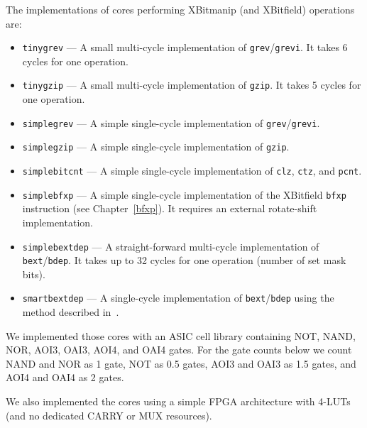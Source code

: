 The implementations of cores performing XBitmanip (and XBitfield) operations are:

\begin{itemize}
\item {\tt tinygrev} --- A small multi-cycle implementation of {\tt grev}/{\tt grevi}.
It takes 6 cycles for one operation.
\item {\tt tinygzip} --- A small multi-cycle implementation of {\tt gzip}.
It takes 5 cycles for one operation.
\item {\tt simplegrev} --- A simple single-cycle implementation of {\tt grev}/{\tt grevi}.
\item {\tt simplegzip} --- A simple single-cycle implementation of {\tt gzip}.
\item {\tt simplebitcnt} --- A simple single-cycle implementation of {\tt clz}, {\tt ctz}, and {\tt pcnt}.
\item {\tt simplebfxp} --- A simple single-cycle implementation of the XBitfield {\tt bfxp}
instruction (see Chapter~\ref{bfxp}). It requires an external rotate-shift implementation.
\item {\tt simplebextdep} --- A straight-forward multi-cycle implementation of {\tt bext}/{\tt bdep}.
It takes up to 32 cycles for one operation (number of set mask bits).
\item {\tt smartbextdep} --- A single-cycle implementation of {\tt bext}/{\tt bdep}
using the method described in~\cite{Hilewitz06}.
\end{itemize}

We implemented those cores with an ASIC cell library containing NOT, NAND, NOR,
AOI3, OAI3, AOI4, and OAI4 gates. For the gate counts below we count NAND and NOR
as 1 gate, NOT as 0.5 gates, AOI3 and OAI3 as 1.5 gates, and AOI4 and OAI4 as 2 gates.

We also implemented the cores using a simple FPGA architecture with 4-LUTs (and no
dedicated CARRY or MUX resources).


